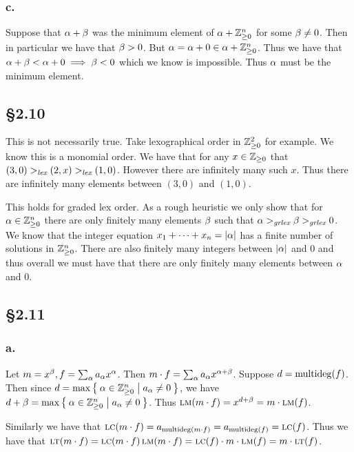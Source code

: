 \documentclass[letterpaper]{article}
\begin{document}
\subsubsection{c.}

Suppose that $\alpha + \beta$ was the minimum element of $\alpha + \mathbb{Z}_{\geq 0}^{n}$ for some $\beta \neq 0$. Then in particular we have that $\beta > 0$. But $\alpha = \alpha + 0 \in \alpha + \mathbb{Z}_{\geq 0}^{n}$. Thus we have that $\alpha + \beta < \alpha + 0 \implies \beta < 0$ which we know is impossible. Thus $\alpha$ must be the minimum element.

\subsection{\S 2.10}

This is not necessarily true. Take lexographical order in $\mathbb{Z}_{\geq 0}^{2}$ for example. We know this is a monomial order. We have that for any $x \in \mathbb{Z}_{\geq 0}$ that $(3, 0) >_{\emph{lex}} (2, x)  >_{\emph{lex}} (1, 0)$. However there are infinitely many such $x$. Thus there are infinitely many elements between $(3, 0)$ and $(1, 0)$.

This holds for graded lex order. As a rough heuristic we only show that for $\alpha \in \mathbb{Z}_{\geq 0}^{n}$ there are only finitely many elements $\beta$ such that $\alpha >_{\emph{grlex}} \beta >_{\emph{grlex}} 0$. We know that the integer equation $x_{1} + \cdots + x_{n} = \abs{\alpha}$ has a finite number of solutions in $\mathbb{Z}_{\geq 0}^{n}$. There are also finitely many integers between $\abs{\alpha}$ and $0$ and thus overall we must have that there are only finitely many elements between $\alpha$ and $0$.


\subsection{\S 2.11}

\subsubsection{a.}

Let $m = x^{\beta}, f = \sum_{\alpha} a_{\alpha}x^{\alpha}$. Then $m \cdot f = \sum_{\alpha} a_{\alpha} x^{\alpha + \beta}$. Suppose $d = \operatorname{multideg}(f)$. Then since $d = \max\Set{\alpha\in \mathbb{Z}_{\geq 0}^{n} | a_{\alpha} \neq 0}$, we have $d + \beta = \max\Set{\alpha\in \mathbb{Z}_{\geq 0}^{n} | a_{\alpha} \neq 0}$. Thus $\operatorname{\textsc{lm}}(m \cdot f) = x^{d + \beta} = m \cdot \operatorname{\textsc{lm}}(f)$.

Similarly we have that $\operatorname{\textsc{lc}}(m \cdot f) = a_{\operatorname{multideg}(m \cdot f)} = a_{\operatorname{multideg}(f)} = \operatorname{\textsc{lc}}(f)$. Thus we have that $\operatorname{\textsc{lt}}(m \cdot f) = \operatorname{\textsc{lc}}(m \cdot f) \operatorname{\textsc{lm}}(m \cdot f) = \operatorname{\textsc{lc}}(f) \cdot m \cdot \operatorname{\textsc{lm}}(f) = m \cdot \operatorname{\textsc{lt}}(f)$.
\end{document}
